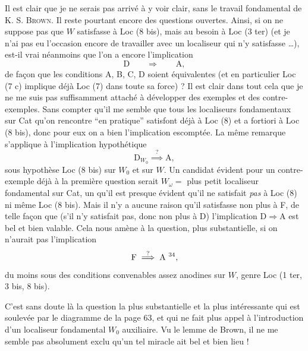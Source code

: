\documentclass[11pt]{article}
\newcommand{\printedpage}[1]{\marginpar{\footnotesize p.~#1}}
\newcommand{\msp}[1]{\marginpar{\footnotesize [#1]}}
\begin{document}
\leavevmode\printedpage{37}%
Il est clair que je ne serais pas arrivé à y voir clair, sans le travail fondamental de K. S. \textsc{Brown}. Il reste pourtant encore des questions ouvertes. Ainsi, si on ne suppose pas que $W$ satisfasse à Loc (8 bis), mais au besoin à Loc (3 ter) (et je n'ai pas eu l'occasion encore de travailler avec un localiseur qui n'y satisfasse \ldots), est-il vrai néanmoins que l'on a encore l'implication
\[
\mathrm{D} \qquad \Longrightarrow \qquad \mathrm{A},
\]
de façon que les conditions A, B, C, D soient équivalentes (et en particulier Loc (7 c) implique déjà Loc (7) dans toute sa force) ? Il est clair dans tout cela que
\msp{page 65}%
je ne me suis pas suffisamment attaché à développer des exemples et des contre-exemples. Sans compter qu'il me semble que tous les localiseurs fondamentaux sur Cat qu'on rencontre “en pratique” satisfont déjà à Loc (8) et a fortiori à Loc (8 bis), donc pour eux on a bien l'implication escomptée. La même remarque s'applique à l'implication hypothétique
\[
\mathrm{D}_{W_0} \overset{?}{\implies} \mathrm{A},
\]
sous hypothèse Loc (8 bis) sur $W_0$ et sur $W$. Un candidat évident pour un contre-exemple déjà à la première question serait $W_\omega=$ plus petit localiseur fondamental sur Cat, un qu'il est presque évident qu'il ne satisfait \textit{pas} à Loc (8) ni même Loc (8 bis). Mais il n'y a aucune raison qu'il satisfasse non plus à F, de telle façon que (s'il n'y satisfait pas, donc non plus à D) l'implication $\mathrm{D}\Longrightarrow\mathrm{A}$ est bel et bien valable. Cela nous amène à la question, plus substantielle, si on n'aurait pas l'implication %
\msp{page 66}%
\[
\mathrm{F} \overset{?}{\implies} \mathrm{A}\ \text{\footnotemark[34]},
\]
%
du moins sous des conditions convenables assez anodines sur $W$, genre Loc (1 ter, 3 bis, 8 bis).

C'est sans doute là la question la plus substantielle et la plus intéressante qui est soulevée par le diagramme de la page 63, et qui ne fait plus appel à l'introduction d'un localiseur fondamental $W_0$ auxiliaire. Vu le lemme de Brown, il ne me semble pas absolument exclu qu'un tel miracle ait bel et bien lieu !
\end{document}
